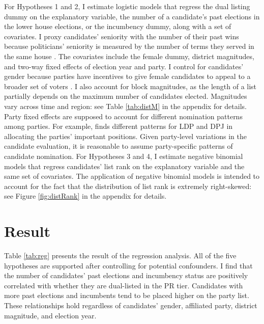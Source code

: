 \documentclass[a4paper, 11pt]{article}
\begin{document}
For Hypotheses 1 and 2, I estimate logistic models that regress the dual listing dummy on the explanatory variable, the number of a candidate's past elections in the lower house elections, or the incumbency dummy, along with a set of covariates. I proxy candidates' seniority with the number of their past wins because politicians' seniority is measured by the number of terms they served in the same house \citep{pekkanen2006electoral}. The covariates include the female dummy, district magnitudes, and two-way fixed effects of election year and party. I control for candidates' gender because parties have incentives to give female candidates to appeal to a broader set of voters \citep{salmond2006proportional, chiru2017value}. I also account for block magnitudes, as the length of a list partially depends on the maximum number of candidates elected. Magnitudes vary across time and region: see Table \ref{tab:distM} in the appendix for details. Party fixed effects are supposed to account for different nomination patterns among parties. For example, \citet{fujimura2012position} finds different patterns for LDP and DPJ in allocating the parties' important positions. Given party-level variations in the candidate evaluation, it is reasonable to assume party-specific patterns of candidate nomination. For Hypotheses 3 and 4, I estimate negative binomial models that regress candidates' list rank on the explanatory variable and the same set of covariates. The application of negative binomial models is intended to account for the fact that the distribution of list rank is extremely right-skewed: see Figure \ref{fig:distRank} in the appendix for details.


\section{Result} \label{sec: res}

Table \ref{tab:reg} presents the result of the regression analysis. All of the five hypotheses are supported after controlling for potential confounders. I find that the number of candidates' past elections and incumbency status are positively correlated with whether they are dual-listed in the PR tier. Candidates with more past elections and incumbents tend to be placed higher on the party list. These relationships hold regardless of candidates' gender, affiliated party, district magnitude, and election year. 
\end{document}
